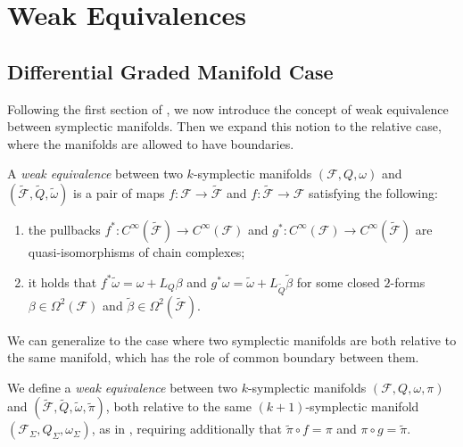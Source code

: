\section{Weak Equivalences}
\label{sec:weak_equiv}

\subsection{Differential Graded Manifold Case}
\label{subsec:dg_mnfs_case}

Following the first section of \cite{Gluing_BV-BFV}, we now introduce the concept of weak equivalence between symplectic manifolds.
Then we expand this notion to the relative case, where the manifolds are allowed to have boundaries.

\begin{definition}
\label{def:weak_1}
    A \emph{weak equivalence} between two $k$-symplectic manifolds $(\mathcal{F}, Q, \omega)$ and $(\widetilde{\mathcal{F}}, \widetilde{Q}, \widetilde{\omega})$ is a pair of maps $f:\mathcal{F} \rightarrow \widetilde{\mathcal{F}}$ and $f:\widetilde{\mathcal{F}} \rightarrow \mathcal{F}$ satisfying the following:
    \begin{enumerate}[label = \roman*)]
        \item \label{enum:weak_a} the pullbacks $f^*:C^\infty(\widetilde{\mathcal{F}}) \rightarrow C^\infty(\mathcal{F})$ and $g^*:C^\infty(\mathcal{F}) \rightarrow C^\infty(\widetilde{\mathcal{F}})$ are quasi-isomorphisms of chain complexes;
        \item \label{enum:weak_b} it holds that $f^* \widetilde{\omega} = \omega + L_Q \beta$ and $g^* \omega = \widetilde{\omega} + L_{\widetilde{Q}} \widetilde{\beta}$ for some closed $2$-forms $\beta \in \Omega^2 (\mathcal{F})$ and $\widetilde{\beta} \in \Omega^2 (\widetilde{\mathcal{F}})$.
    \end{enumerate}
\end{definition}


We can generalize  to the case where two symplectic manifolds are both relative to the same manifold, which has the role of common boundary between them.

\begin{definition}
\label{def:weak_relative}
    We define a \emph{weak equivalence} between two $k$-symplectic manifolds $(\mathcal{F}, Q, \omega, \pi)$ and $(\widetilde{\mathcal{F}}, \widetilde{Q}, \widetilde{\omega}, \widetilde{\pi})$, both relative to the same $(k+1)$-symplectic manifold $(\mathcal{F}_\Sigma, Q_\Sigma, \omega_\Sigma)$, as in , requiring additionally that $\widetilde{\pi} \circ f = \pi$ and $\pi \circ g = \widetilde{\pi}$.
\end{definition}

